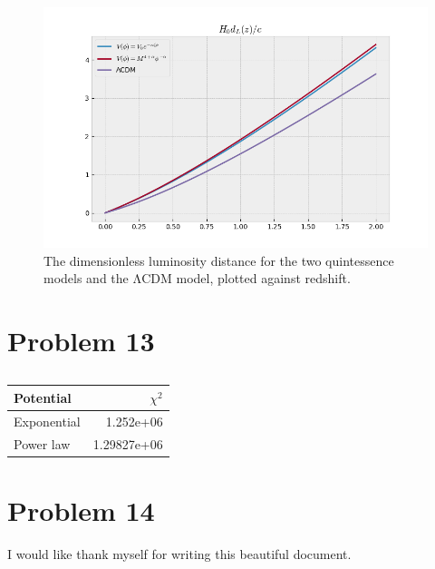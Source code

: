 \documentclass[reprint,english,notitlepage]{revtex4-1}  %
\begin{document}
\begin{figure}[h!]
	\includegraphics[scale=0.4]{lum_distance.png}
	\caption{The dimensionless luminosity distance for the two quintessence models
	 and the ΛCDM model, plotted against redshift.}
	\label{}
\end{figure}


\section{Problem 13}

\begin{table}
	\begin{tabular}{|l|r|}
\hline
 Potential   &   $\chi^2$  \\
\hline
 Exponential & 1.252e+06   \\
 Power law   & 1.29827e+06 \\
\hline
\end{tabular}
	\caption{}
	\label{}
\end{table}

\section{Problem 14}



\begin{acknowledgments}  %
I would like thank myself for writing this beautiful document.
\end{acknowledgments}


\end{document}
